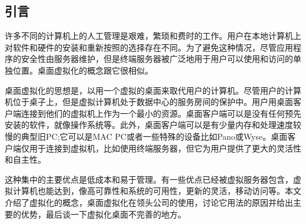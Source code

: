 \documentclass[10pt,a4paper]{article}
\begin{document}
\begin{CJK*}{UTF8}{gkai}
\section{引言}
许多不同的计算机上的人工管理是艰难，繁琐和费时的工作。用户在本地计算机上对软件和硬件的安装和重新按照的选择存在不同。为了避免这种情况，尽管应用程序的安全性由服务器维护，但是终端服务器被广泛地用于用户可以使用和访问的单独位置。桌面虚拟化的概念跟它很相似。 


桌面虚拟化的思想是，以用一个虚拟的桌面来取代用户的计算机。尽管用户的计算机位于桌子上，但是虚拟计算机处于数据中心的服务房间的保护中。用户用桌面客户端连接到他们的虚拟机上作为一个最小的资源。桌面客户端可以是没有任何预先安装的软件，就像操作系统等。此外，桌面客户端可以是有少量内存和处理速度较慢的典型旧PC;它可以是MAC PC或者一些特殊的设备比如Pano或Wyse。桌面客户端仅用于连接到虚拟机，比如使用终端服务器，但它为用户提供了更大的灵活性和自主性。 


这种集中的主要优点是低成本和易于管理。有一些优点已经被虚拟服务器包含，虚拟计算机也能达到，像高可靠性和系统的可用性，更新的灵活，移动访问等。本文介绍了虚拟化的概念，桌面虚拟化在领头公司的使用，讨论它用法的原因并给出主要的优势，最后谈一下虚拟化桌面不完善的地方。



\end{CJK*}
\end{document}
